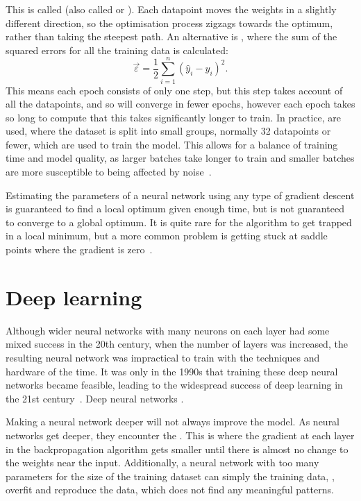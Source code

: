 This is called  (also called  or ).
Each datapoint moves the weights in a slightly different direction, so the optimisation process zigzags towards the optimum, rather than taking the steepest path.
An alternative is , where the sum of the squared errors for all the training data is calculated:
\[ \vec{\varepsilon} = \frac{1}{2} \sum_{i = 1}^{n}\left(\hat{y}_i - y_i\right)^2. \]
This means each epoch consists of only one step, but this step takes account of all the datapoints, and so will converge in fewer epochs, however each epoch takes so long to compute that this takes significantly longer to train.
In practice,  are used, where the dataset is split into small groups, normally 32 datapoints or fewer, which are used to train the model.
This allows for a balance of training time and model quality, as larger batches take longer to train and smaller batches are more susceptible to being affected by noise~\autocite[59]{thoma2017}.

Estimating the parameters of a neural network using any type of gradient descent is guaranteed to find a local optimum given enough time, but is not guaranteed to converge to a global optimum.
It is quite rare for the algorithm to get trapped in a local minimum, but a more common problem is getting stuck at saddle points where the gradient is zero~\autocite[438]{lecun2015}.

\section{Deep learning} \label{sec:deep-learning}

Although wider neural networks with many neurons on each layer had some mixed success in the 20th century, when the number of layers was increased, the resulting neural network was impractical to train with the techniques and hardware of the time.
It was only in the 1990s that training these deep neural networks became feasible, leading to the widespread success of deep learning in the 21st century~\autocite[86]{schmidhuber2015}.
Deep neural networks .

Making a neural network deeper will not always improve the model.
As neural networks get deeper, they encounter the .
This is where the gradient at each layer in the backpropagation algorithm gets smaller until there is almost no change to the weights near the input. 
Additionally, a neural network with too many parameters for the size of the training dataset can simply  the training data, \ie{}, overfit and reproduce the data, which does not find any meaningful patterns.

